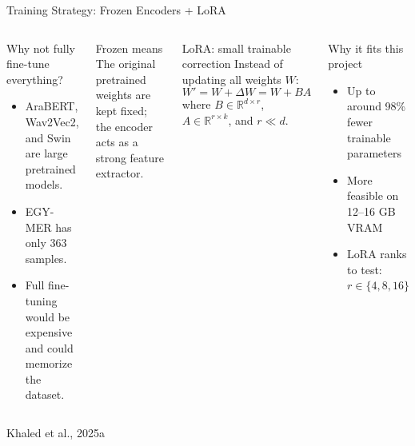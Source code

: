 \documentclass[aspectratio=169,10pt]{beamer}
\newcommand{\source}[1]{\vspace{0.05cm}\hfill{\scriptsize\textcolor{MutedGray}{#1}}}
\begin{document}
\begin{frame}[t]{Training Strategy: Frozen Encoders + LoRA}
\begin{columns}[T,onlytextwidth]
\begin{block}{Why not fully fine-tune everything?}
\begin{itemize}
  \item AraBERT, Wav2Vec2, and Swin are large pretrained models.
  \item EGY-MER has only 363 samples.
  \item Full fine-tuning would be expensive and could memorize the dataset.
\end{itemize}
\end{block}
\begin{exampleblock}{Frozen means}
The original pretrained weights are kept fixed; the encoder acts as a strong feature extractor.
\end{exampleblock}
\begin{block}{LoRA: small trainable correction}
Instead of updating all weights $W$:
\[
W' = W + \Delta W = W + BA
\]
where $B \in \mathbb{R}^{d \times r}$, $A \in \mathbb{R}^{r \times k}$, and $r \ll d$.
\end{block}
\begin{alertblock}{Why it fits this project}
\begin{itemize}
  \item Up to around 98\% fewer trainable parameters
  \item More feasible on 12--16 GB VRAM
  \item LoRA ranks to test: $r \in \{4,8,16\}$
\end{itemize}
\end{alertblock}
\end{columns}
\source{Khaled et al., 2025a}
\end{frame}
\end{document}
